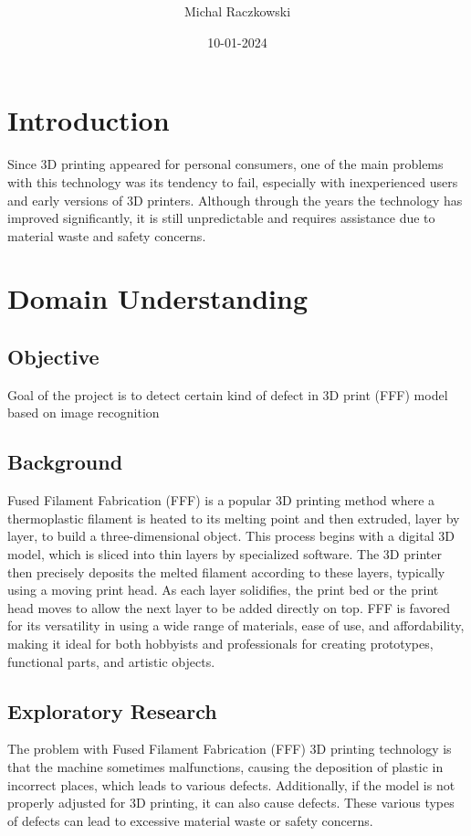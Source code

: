 \documentclass[12pt,a4paper]{article}
\title{\textbf{ }}
\author{Michal Raczkowski}
\date{10-01-2024}
\begin{document}
\maketitle
\thispagestyle{empty} %

\newpage
\tableofcontents
\newpage

\setcounter{page}{1} %

\section{Introduction}
Since 3D printing appeared for personal consumers, one of the main problems with this technology was its tendency to fail, especially with inexperienced users and early versions of 3D printers. Although through the years the technology has improved significantly, it is still unpredictable and requires assistance due to material waste and safety concerns.

\section{Domain Understanding}
\subsection{Objective}
Goal of the project is to detect certain kind of defect in 3D print (FFF) model based on image recognition
\subsection{Background}
Fused Filament Fabrication (FFF) is a popular 3D printing method where a thermoplastic filament is heated to its melting point and then extruded, layer by layer, to build a three-dimensional object. This process begins with a digital 3D model, which is sliced into thin layers by specialized software. The 3D printer then precisely deposits the melted filament according to these layers, typically using a moving print head. As each layer solidifies, the print bed or the print head moves to allow the next layer to be added directly on top. FFF is favored for its versatility in using a wide range of materials, ease of use, and affordability, making it ideal for both hobbyists and professionals for creating prototypes, functional parts, and artistic objects.
\subsection{Exploratory Research}
The problem with Fused Filament Fabrication (FFF) 3D printing technology is that the machine sometimes malfunctions, causing the deposition of plastic in incorrect places, which leads to various defects. Additionally, if the model is not properly adjusted for 3D printing, it can also cause defects. These various types of defects can lead to excessive material waste or safety concerns.
\end{document}
